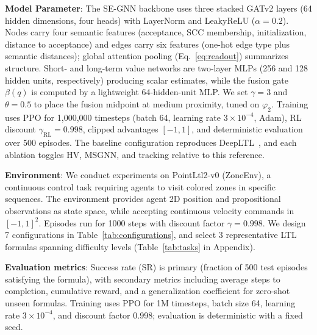 \documentclass{article}
\begin{document}
\textbf{Model Parameter}: The SE-GNN backbone uses three stacked GATv2 layers (64 hidden dimensions, four heads) with LayerNorm and LeakyReLU ($\alpha = 0.2$). Nodes carry four semantic features (acceptance, SCC membership, initialization, distance to acceptance) and edges carry six features (one-hot edge type plus semantic distances); global attention pooling (Eq.~\ref{eq:readout}) summarizes structure. Short- and long-term value networks are two-layer MLPs (256 and 128 hidden units, respectively) producing scalar estimates, while the fusion gate $\beta(q)$ is computed by a lightweight 64-hidden-unit MLP. We set $\gamma = 3$ and $\theta = 0.5$ to place the fusion midpoint at medium proximity, tuned on $\varphi_2$. Training uses PPO for 1{,}000{,}000 timesteps (batch 64, learning rate $3 \times 10^{-4}$, Adam), RL discount $\gamma_{\text{RL}} = 0.998$, clipped advantages $[-1,1]$, and deterministic evaluation over 500 episodes. The baseline configuration reproduces DeepLTL~\citep{deepltl}, and each ablation toggles HV, MSGNN, and tracking relative to this reference.

\textbf{Environment}: We conduct experiments on PointLtl2-v0 (ZoneEnv), a continuous control task requiring agents to visit colored zones in specific sequences. The environment provides agent 2D position and propositional observations as state space, while accepting continuous velocity commands in $[-1, 1]^2$. Episodes run for 1000 steps with discount factor $\gamma = 0.998$. We design 7 configurations in Table~\ref{tab:configurations}, and select 3 representative LTL formulas spanning difficulty levels (Table~\ref{tab:tasks} in Appendix).


\textbf{Evaluation metrics}: Success rate (SR) is primary (fraction of 500 test episodes satisfying the formula), with secondary metrics including average steps to completion, cumulative reward, and a generalization coefficient for zero-shot unseen formulas. Training uses PPO for 1M timesteps, batch size 64, learning rate $3 \times 10^{-4}$, and discount factor 0.998; evaluation is deterministic with a fixed seed.

\end{document}
